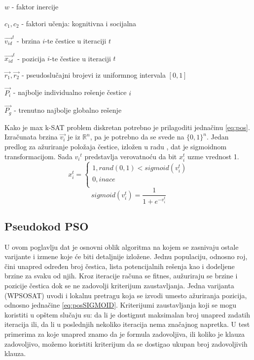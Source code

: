 \documentclass{article}
\begin{document}
\begin{list}{•}{}
	\item $w$ - faktor inercije
	\item $c_1, c_2$ - faktori učenja: kognitivna i socijalna
	\item $\vec{v_{id}}^{t}$ - brzina $i$-te čestice u iteraciji $t$ 
	\item $\vec{x_{id}}^{t}$ - pozicija $i$-te čestice u iteraciji $t$ 
	\item $\vec{r_1}, \vec{r_2}$ - pseudoslučajni brojevi iz uniformnog intervala $[0,1]$
	\item $\vec{P_i}$ - najbolje individualno rešenje čestice $i$
	\item $\vec{P_g}$ - trenutno najbolje globalno rešenje\\ 
\end{list}

Kako je max k-SAT problem diskretan potrebno je prilagoditi jednačinu \ref{eq:pos}. Izračunata brzina $\vec{v_{i}}$ je iz $\mathbb{R}^n$, pa je potrebno da se svede na $\{ 0,1 \}^n$. Jedan predlog za ažuriranje položaja čestice, izložen u radu \cite{sigmoid}, dat je sigmoidnom transformacijom. Sada ${v_{i}}^{t}$ predstavlja verovatnoću da bit $x_{i}^{t}$ uzme vrednost 1.  \\

\begin{equation}\label{eq:posSIGMOID}
x_{i}^{t}=\begin{cases}
               1, rand(0,1) < sigmoid(v_{i}^{t})\\
               0, inace\\
            \end{cases}
\end{equation}\label{eq:sigmoid}
\begin{equation}
sigmoid(v_{i}^{t}) = \frac{1}{1+e^{-v_{i}^{t}}}
\end{equation}
 
 
\subsection{Pseudokod PSO}
\label{sec:pso_pseudokod}

U ovom poglavlju dat je osnovni oblik algoritma na kojem se zasnivaju ostale varijante i izmene koje će biti detaljnije izložene. Jednu populaciju, odnosno roj, čini unapred određen broj čestica, lista potencijalnih rešenja kao i dodeljene brzine za svaku od njih. 
Kroz iteracije računa se fitnes, aužuriraju se brzine i pozicije čestica dok se ne zadovolji kriterijum zaustavljanja. 
Jedna varijanta (WPSOSAT) uvodi i lokalnu pretragu koja se izvodi umesto ažuriranja pozicija, odnosno jednačine \ref{eq:posSIGMOID}.
Kriterijumi zaustavljanja koji se mogu koristiti u opštem slučaju su: da li je dostignut maksimalan broj unapred zadatih iteracija ili, da li u poslednjih nekoliko iteracija nema značajnog napretka.
U test primerima za koje unapred znamo da je formula zadovoljiva, ili koliko je klauza zadovoljivo, možemo koristiti kriterijum da se dostigao ukupan broj zadovoljivih klauza. \\
\end{document}
